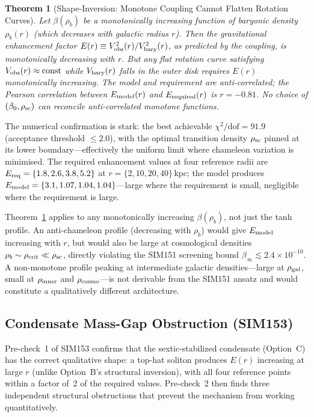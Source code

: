 \documentclass[12pt,a4paper]{article}
\theoremstyle{plain}
\newtheorem{theorem}{Theorem}
\begin{document}
\begin{theorem}[Shape-Inversion: Monotone Coupling Cannot Flatten Rotation Curves]
\label{thm:shapeinversion}
Let $\beta(\rho_b)$ be a monotonically increasing function of baryonic density
$\rho_b(r)$ (which decreases with galactic radius $r$).  Then the gravitational
enhancement factor $E(r) \equiv V_{\rm obs}^2(r)/V_{\rm bary}^2(r)$, as predicted
by the coupling, is monotonically \emph{decreasing} with $r$.  But any flat
rotation curve satisfying $V_{\rm obs}(r) \approx \text{const}$ while
$V_{\rm bary}(r)$ falls in the outer disk requires $E(r)$ monotonically
\emph{increasing}.  The model and requirement are anti-correlated; the Pearson
correlation between $E_{\rm model}(r)$ and $E_{\rm required}(r)$ is $r = -0.81$.
No choice of $(\beta_0, \rho_{\rm sc})$ can reconcile anti-correlated monotone
functions.
\end{theorem}

The numerical confirmation is stark: the best achievable $\chi^2/\mathrm{dof} = 91.9$
(acceptance threshold $\leq 2.0$), with the optimal transition density $\rho_{\rm sc}$
pinned at its lower boundary---effectively the uniform limit where chameleon variation
is minimised.  The required enhancement values at four reference radii are
$E_{\rm req} = \{1.8, 2.6, 3.8, 5.2\}$ at $r = \{2, 10, 20, 40\}\,\mathrm{kpc}$;
the model produces $E_{\rm model} = \{3.1, 1.07, 1.04, 1.04\}$---large where the
requirement is small, negligible where the requirement is large.

Theorem~\ref{thm:shapeinversion} applies to any monotonically increasing $\beta(\rho_b)$,
not just the tanh profile.  An anti-chameleon profile (decreasing with $\rho_b$) would
give $E_{\rm model}$ increasing with $r$, but would also be large at cosmological
densities $\rho_b \sim \rho_{\rm crit} \ll \rho_{\rm sc}$, directly violating the
SIM151 screening bound $\beta_\infty \lesssim 2.4\times10^{-10}$.  A non-monotone
profile peaking at intermediate galactic densities---large at $\rho_{\rm gal}$,
small at $\rho_{\rm inner}$ and $\rho_{\rm cosmo}$---is not derivable from the
SIM151 ansatz and would constitute a qualitatively different architecture.

\subsection{Condensate Mass-Gap Obstruction (SIM153)}
\label{sec:condensate}

Pre-check~1 of SIM153 confirms that the sextic-stabilized condensate (Option~C)
has the correct qualitative shape: a top-hat soliton produces $E(r)$ increasing
at large $r$ (unlike Option~B's structural inversion), with all four reference
points within a factor of~2 of the required values.  Pre-check~2 then finds three
independent structural obstructions that prevent the mechanism from working
quantitatively.
\end{document}
